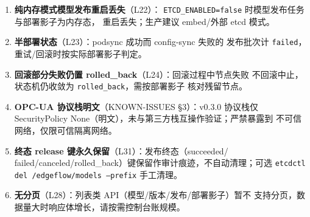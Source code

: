 \begin{enumerate}
        （scale 0→1）；v0.5.0 × v0.6.0 混跑会误删活节点（旧版 GC 无 hb
        视角），v0.6.0 × v0.7.0 混跑未验证，建议同版本全量切换。
  \item \textbf{纯内存模式模型发布重启丢失}（L22）：
        \texttt{ETCD\_ENABLED=false} 时模型发布任务与部署影子为内存态，
        重启丢失；生产建议 embed/外部 etcd 模式。
  \item \textbf{半部署状态}（L23）：podsync 成功而 config-sync 失败的
        发布批次计 \texttt{failed}，重试/回滚时按实际部署影子判定。
  \item \textbf{回滚部分失败仍置 rolled\_back}（L24）：回滚过程中节点失败
        不回滚中止，状态机仍收敛为 \texttt{rolled\_back}，需按部署影子
        核对残留节点。
  \item \textbf{OPC-UA 协议栈明文}（KNOWN-ISSUES §3）：v0.3.0 协议栈仅
        SecurityPolicy None（明文），未与第三方栈互操作验证；严禁暴露到
        不可信网络，仅限可信隔离网络。
  \item \textbf{终态 release 键永久保留}（L31）：发布终态（succeeded/
        failed/canceled/rolled\_back）键保留作审计痕迹，不自动清理；可选
        \texttt{etcdctl del /edgeflow/models --prefix} 手工清理。
  \item \textbf{无分页}（L28）：列表类 API（模型/版本/发布/部署影子）暂不
        支持分页，数据量大时响应体增长，请按需控制台账规模。
\end{enumerate}
